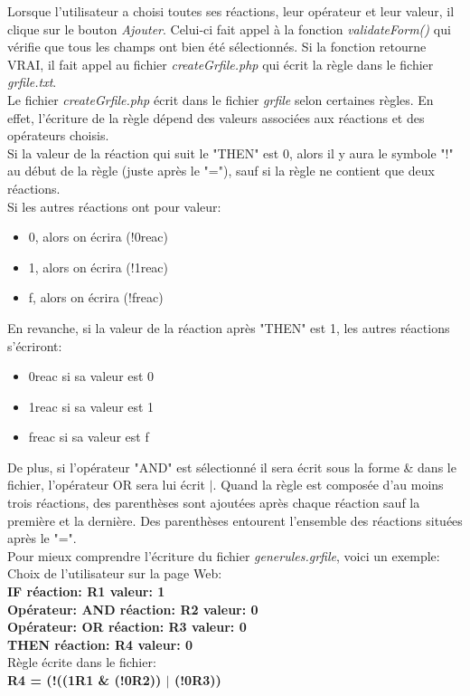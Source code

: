 Lorsque l'utilisateur a choisi toutes ses réactions, leur opérateur et leur valeur, il clique sur le bouton \emph{Ajouter}. Celui-ci fait appel à la fonction \emph{validateForm()} qui vérifie que tous les champs ont bien été sélectionnés. Si la fonction retourne VRAI, il fait appel au fichier \emph{createGrfile.php} qui écrit la règle dans le fichier \emph{grfile.txt}.\\
Le fichier \emph{createGrfile.php} écrit dans le fichier \emph{grfile} selon certaines règles. En effet, l'écriture de la règle dépend des valeurs associées aux réactions et des opérateurs choisis.\\

Si la valeur de la réaction qui suit le "THEN" est 0, alors il y aura le symbole "!" au début de la règle (juste après le "="), sauf si la règle ne contient que deux réactions.\\
Si les autres réactions ont pour valeur:
\begin{itemize}
\item 0, alors on écrira (!0reac)
\item 1, alors on écrira (!1reac)
\item f, alors on écrira (!freac)
\end{itemize}
En revanche, si la valeur de la réaction après "THEN" est 1, les autres réactions s'écriront:
\begin{itemize}
\item 0reac si sa valeur est 0
\item 1reac si sa valeur est 1
\item freac si sa valeur est f
\end{itemize}
De plus, si l'opérateur "AND" est sélectionné il sera écrit sous la forme \& dans le fichier, l'opérateur OR sera lui écrit $|$. Quand la règle est composée d'au moins trois réactions, des parenthèses sont ajoutées après chaque réaction sauf la première et la dernière. Des parenthèses entourent l'ensemble des réactions situées après le "=".\\

Pour mieux comprendre l'écriture du fichier \emph{generules.grfile}, voici un exemple:\\
Choix de l'utilisateur sur la page Web:\\
\textbf{IF réaction: R1 valeur: 1\\
Opérateur: AND réaction: R2 valeur: 0\\
Opérateur: OR réaction: R3 valeur: 0\\
THEN réaction: R4 valeur: 0}\\

Règle écrite dans le fichier: \\
\textbf{R4 = (!((1R1 \& (!0R2)) $|$ (!0R3))}

